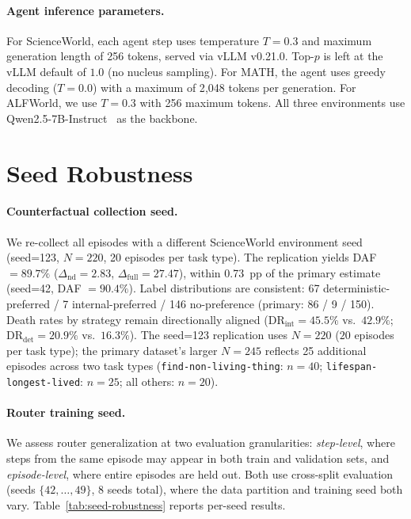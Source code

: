 \documentclass[11pt]{article}
\begin{document}
\paragraph{Agent inference parameters.}
For ScienceWorld, each agent step uses temperature $T{=}0.3$ and maximum generation length of 256 tokens, served via vLLM v0.21.0. Top-$p$ is left at the vLLM default of $1.0$ (no nucleus sampling). For MATH, the agent uses greedy decoding ($T{=}0.0$) with a maximum of 2{,}048 tokens per generation. For ALFWorld, we use $T{=}0.3$ with 256 maximum tokens. All three environments use Qwen2.5-7B-Instruct~\citep{qwen25-2024} as the backbone.

\section{Seed Robustness}
\label{app:seed-robustness}

\paragraph{Counterfactual collection seed.}
We re-collect all episodes with a different ScienceWorld environment seed (seed=123, $N{=}220$, 20 episodes per task type).
The replication yields DAF $= 89.7\%$ ($\Delta_\text{nd} = 2.83$, $\Delta_\text{full} = 27.47$),
within 0.73~pp of the primary estimate (seed=42, DAF $= 90.4\%$).
Label distributions are consistent: 67 deterministic-preferred / 7 internal-preferred / 146 no-preference
(primary: 86 / 9 / 150).
Death rates by strategy remain directionally aligned ($\text{DR}_\text{int} = 45.5\%$ vs.\ $42.9\%$; $\text{DR}_\text{det} = 20.9\%$ vs.\ $16.3\%$).
The seed=123 replication uses $N{=}220$ ($20$ episodes per task type);
the primary dataset's larger $N{=}245$ reflects 25 additional episodes across two task types (\texttt{find-non-living-thing}: $n{=}40$; \texttt{lifespan-longest-lived}: $n{=}25$; all others: $n{=}20$).

\paragraph{Router training seed.}
We assess router generalization at two evaluation granularities: \emph{step-level}, where steps from the same episode may appear in both train and validation sets, and \emph{episode-level}, where entire episodes are held out. Both use cross-split evaluation (seeds $\{42, \ldots, 49\}$, 8 seeds total), where the data partition and training seed both vary. Table~\ref{tab:seed-robustness} reports per-seed results.
\end{document}
